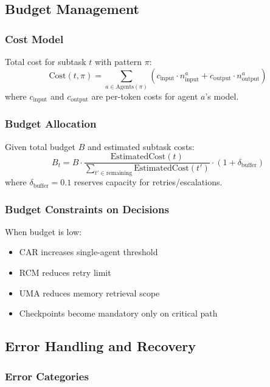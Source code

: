 \documentclass{article}
\theoremstyle{plain}
\theoremstyle{definition}
\theoremstyle{remark}
\begin{document}
\subsection{Budget Management}
\label{sec:budget}

\subsubsection{Cost Model}

Total cost for subtask $t$ with pattern $\pi$:
\begin{equation}
	\text{Cost}(t, \pi) = \sum_{a \in \text{Agents}(\pi)} (c_{\text{input}} \cdot n_{\text{input}}^a + c_{\text{output}} \cdot n_{\text{output}}^a)
\end{equation}
where $c_{\text{input}}$ and $c_{\text{output}}$ are per-token costs for agent $a$'s model.

\subsubsection{Budget Allocation}

Given total budget $B$ and estimated subtask costs:
\begin{equation}
	B_t = B \cdot \frac{\text{EstimatedCost}(t)}{\sum_{t' \in \text{remaining}} \text{EstimatedCost}(t')} \cdot (1 + \delta_{\text{buffer}})
\end{equation}
where $\delta_{\text{buffer}} = 0.1$ reserves capacity for retries/escalations.

\subsubsection{Budget Constraints on Decisions}

When budget is low:
\begin{itemize}
	\item CAR increases single-agent threshold
	\item RCM reduces retry limit
	\item UMA reduces memory retrieval scope
	\item Checkpoints become mandatory only on critical path
\end{itemize}

\subsection{Error Handling and Recovery}
\label{sec:errors}

\subsubsection{Error Categories}
\end{document}
